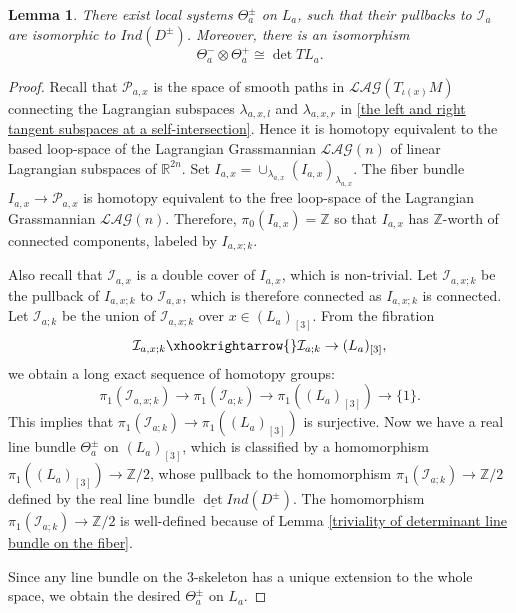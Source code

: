 \documentclass{amsart}
\newtheorem{lemma}[theorem]{Lemma}
\numberwithin{equation}{section}
\numberwithin{figure}{section}
\begin{document}
\begin{lemma}
	There exist local systems $\Theta_{a}^{\pm}$ on $L_{a}$, such that their pullbacks to $\mathcal{I}_{a}$ are isomorphic to $Ind(D^{\pm})$. Moreover, there is an isomorphism
\begin{equation}
\Theta_{a}^{-} \otimes \Theta_{a}^{+} \cong \det TL_{a}.
\end{equation}
\end{lemma}
\begin{proof}
	Recall that $\mathcal{P}_{a, x}$ is the space of smooth paths in $\mathcal{LAG}(T_{\iota(x)}M)$ connecting the Lagrangian subspaces $\lambda_{a, x, l}$ and $\lambda_{a, x, r}$ in \eqref{the left and right tangent subspaces at a self-intersection}. Hence it is homotopy equivalent to the based loop-space of the Lagrangian Grassmannian $\mathcal{LAG}(n)$ of linear Lagrangian subspaces of $\mathbb{R}^{2n}$. Set $I_{a, x} = \cup_{\lambda_{a, x}} (I_{a, x})_{\lambda_{a, x}}$. The fiber bundle $I_{a, x} \to \mathcal{P}_{a, x}$ is homotopy equivalent to the free loop-space of the Lagrangian Grassmannian $\mathcal{LAG}(n)$.  Therefore, $\pi_{0}(I_{a, x}) = \mathbb{Z}$ so that $I_{a, x}$ has $\mathbb{Z}$-worth of connected components, labeled by $I_{a, x; k}$. \par
	Also recall that $\mathcal{I}_{a, x}$ is a double cover of $I_{a, x}$, which is non-trivial. Let $\mathcal{I}_{a, x; k}$ be the pullback of $I_{a, x; k}$ to $\mathcal{I}_{a, x}$, which is therefore connected as $I_{a, x; k}$ is connected. Let $\mathcal{I}_{a; k}$ be the union of $\mathcal{I}_{a, x; k}$ over $x \in (L_{a})_{[3]}$. From the fibration 
\begin{equation*}
\mathcal{I}_{a, x; k} \xhookrightarrow{} \mathcal{I}_{a; k} \to (L_{a})_{[3]},
\end{equation*}
we obtain a long exact sequence of homotopy groups:
\begin{equation}
\pi_{1}(\mathcal{I}_{a, x; k}) \to \pi_{1}(\mathcal{I}_{a; k}) \to \pi_{1}((L_{a})_{[3]}) \to \{1\}.
\end{equation}
This implies that $\pi_{1}(\mathcal{I}_{a; k}) \to \pi_{1}((L_{a})_{[3]})$ is surjective. Now we have a real line bundle $\Theta_{a}^{\pm}$ on $(L_{a})_{[3]}$, which is classified by a homomorphism $\pi_{1}((L_{a})_{[3]}) \to \mathbb{Z}/2$, whose pullback to the homomorphism $\pi_{1}(\mathcal{I}_{a; k}) \to \mathbb{Z}/2$ defined by the real line bundle $\underline{\det} Ind(D^{\pm})$. The homomorphism $\pi_{1}(\mathcal{I}_{a; k}) \to \mathbb{Z}/2$ is well-defined because of Lemma \ref{triviality of determinant line bundle on the fiber}. \par
	Since any line bundle on the $3$-skeleton has a unique extension to the whole space, we obtain the desired $\Theta_{a}^{\pm}$ on $L_{a}$.
\end{proof}
\end{document}

